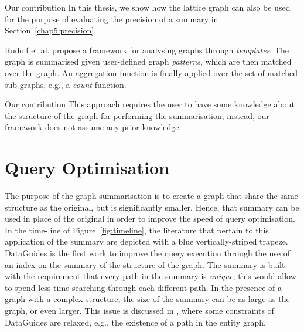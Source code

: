 \begin{centeremph}{Our contribution}
	In this thesis, we show how the \gls{lattice} graph can also be used for the purpose of evaluating the precision of a summary in Section~\ref{chap5:precision}.
\end{centeremph}

Rudolf et al. \cite{rudolf:2013:slg} propose a framework for analysing graphs through \emph{templates}. The graph is summarised given user-defined graph \emph{patterns}, which are then matched over the graph. An aggregation function is finally applied over the set of matched sub-graphs, e.g., a \emph{count} function.

\begin{centeremph}{Our contribution}
	This approach requires the user to have some knowledge about the structure of the graph for performing the summarisation; instead, our framework does not assume any prior knowledge.
\end{centeremph}

\section{Query Optimisation}
\label{chap3:review:query-optim}

The purpose of the graph summarisation is to create a graph that share the same structure as the original, but is significantly smaller. Hence, that summary can be used in place of the original in order to improve the speed of query optimisation. In the time-line of Figure~\ref{fig:timeline}, the literature that pertain to this application of the summary are depicted with a blue vertically-striped trapeze.\\

DataGuides \cite{goldman1997dataguides} is the first work to improve the query execution through the use of an index on the summary of the structure of the graph. The summary is built with the requirement that every path in the summary is \emph{unique}; this would allow to spend less time searching through each different path. In the presence of a graph with a complex structure, the size of the summary can be as large as the graph, or even larger. This issue is discussed in \cite{goldman1999approximate}, where some constraints of DataGuides are relaxed, e.g., the existence of a path in the entity graph.\\

